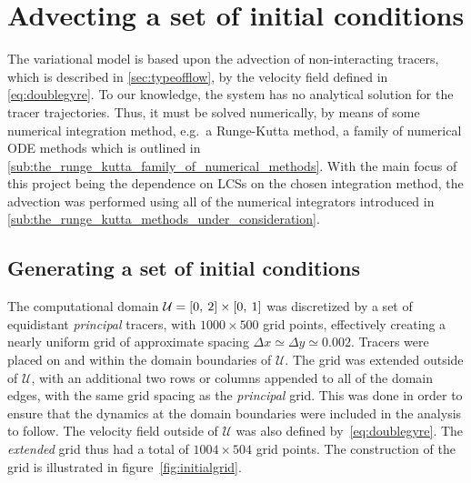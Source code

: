 \section{Advecting a set of initial conditions}
\label{sec:advecting_a_set_of_initial_conditions}

The variational model is based upon the advection of non-interacting tracers,
which is described in \cref{sec:typeofflow}, by the velocity field defined in
\cref{eq:doublegyre}. To our knowledge, the system has no analytical
solution for the tracer trajectories. Thus, it must be solved numerically, by
means of some numerical integration method, e.g.\ a Runge-Kutta method, a
family of numerical ODE methods which is outlined in
\cref{sub:the_runge_kutta_family_of_numerical_methods}. With the main focus of
this project being the dependence on LCSs on the chosen integration method, the
advection was performed using all of the numerical integrators introduced in
\cref{sub:the_runge_kutta_methods_under_consideration}.

\subsection{Generating a set of initial conditions}
\label{sub:generating_a_set_of_initial_conditions}
The computational domain $\mathcal{U}=[0,\hspace{0.5ex}2]\times[0,\hspace{0.5ex}1]$
was discretized by a set of equidistant \emph{principal} tracers, with
$1000\times500$  grid points, effectively creating a nearly uniform grid of
approximate spacing $\Delta{x}\simeq\Delta{y}\simeq0.002$. Tracers were placed
on and within the domain boundaries of $\mathcal{U}$. The grid was extended
outside of $\mathcal{U}$, with an additional two rows or columns appended to all
of the domain edges, with the same grid spacing as the \emph{principal} grid.
This was done in order to ensure that the dynamics at the domain boundaries
were included in the analysis to follow. The velocity field outside of
$\mathcal{U}$ was also defined by~\cref{eq:doublegyre}. The
\emph{extended} grid thus had a total of $1004\times504$ grid points.
The construction of the grid is illustrated in figure~\ref{fig:initialgrid}.
\clearpage


